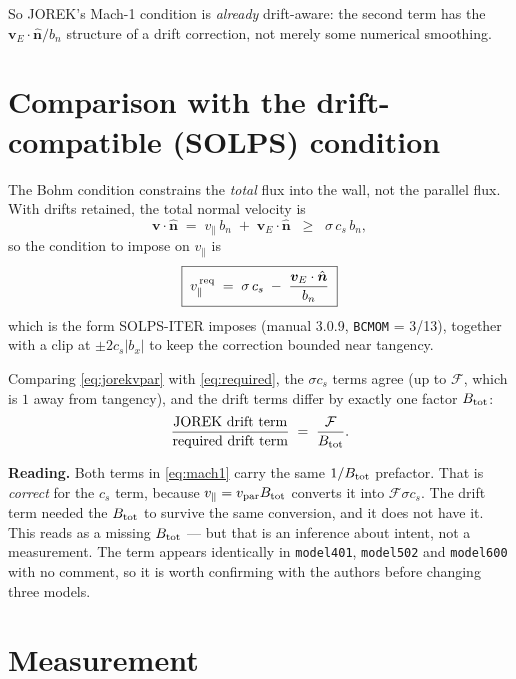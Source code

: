 \documentclass[11pt,a4paper]{article}
\newcommand{\code}[1]{\texttt{\small #1}}
\newcommand{\nhat}{\hat{\bm{n}}}
\newcommand{\vE}{\bm{v}_E}
\begin{document}
\noindent So JOREK's Mach-1 condition is \emph{already} drift-aware: the second term has the
$\vE\cdot\nhat/b_n$ structure of a drift correction, not merely some numerical smoothing.

\section{Comparison with the drift-compatible (SOLPS) condition}
\label{sec:compare}

The Bohm condition constrains the \emph{total} flux into the wall, not the parallel flux.  With
drifts retained, the total normal velocity is
\begin{equation}
  \bm{v}\cdot\nhat \;=\; v_\parallel\,b_n \;+\; \vE\cdot\nhat \;\;\ge\;\; \sigma\,c_s\,b_n ,
\end{equation}
so the condition to impose on $v_\parallel$ is
\begin{equation}
  \boxed{\;
  v_\parallel^{\,\rm req}
  \;=\; \sigma\,c_s \;-\; \frac{\vE\cdot\nhat}{b_n}
  \;}
  \label{eq:required}
\end{equation}
which is the form SOLPS-ITER imposes (manual 3.0.9, \code{BCMOM} = 3/13), together with a clip
at $\pm 2c_s|b_x|$ to keep the correction bounded near tangency.

Comparing \eqref{eq:jorekvpar} with \eqref{eq:required}, the $\sigma c_s$ terms agree (up to
$\mathcal{F}$, which is $1$ away from tangency), and the drift terms differ by exactly one
factor $B_{\rm tot}$:
\begin{equation}
  \frac{\text{JOREK drift term}}{\text{required drift term}}
  \;=\; \frac{\mathcal{F}}{B_{\rm tot}} .
  \label{eq:ratio}
\end{equation}

\begin{keybox}
\textbf{Reading.} Both terms in \eqref{eq:mach1} carry the same $1/B_{\rm tot}$ prefactor.
That is \emph{correct} for the $c_s$ term, because $v_\parallel = v_{\rm par}B_{\rm tot}$
converts it into $\mathcal{F}\sigma c_s$.  The drift term needed the $B_{\rm tot}$ to survive
the same conversion, and it does not have it.  This reads as a missing $B_{\rm tot}$ --- but
that is an inference about intent, not a measurement.  The term appears identically in
\code{model401}, \code{model502} and \code{model600} with no comment, so it is worth
confirming with the authors before changing three models.
\end{keybox}

\section{Measurement}
\end{document}

